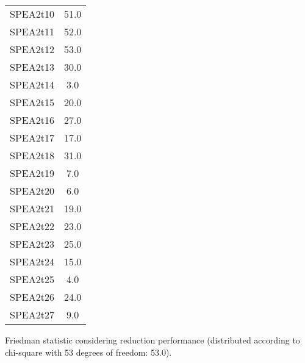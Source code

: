 \documentclass{article}
\begin{document}
\begin{table}[!htp]
\begin{tabular}{c|c}
SPEA2t10&51.0\\
SPEA2t11&52.0\\
SPEA2t12&53.0\\
SPEA2t13&30.0\\
SPEA2t14&3.0\\
SPEA2t15&20.0\\
SPEA2t16&27.0\\
SPEA2t17&17.0\\
SPEA2t18&31.0\\
SPEA2t19&7.0\\
SPEA2t20&6.0\\
SPEA2t21&19.0\\
SPEA2t22&23.0\\
SPEA2t23&25.0\\
SPEA2t24&15.0\\
SPEA2t25&4.0\\
SPEA2t26&24.0\\
SPEA2t27&9.0\\
\end{tabular}
\end{table}


Friedman statistic considering reduction performance (distributed according to chi-square with 53 degrees of freedom: 53.0).
\end{document}
